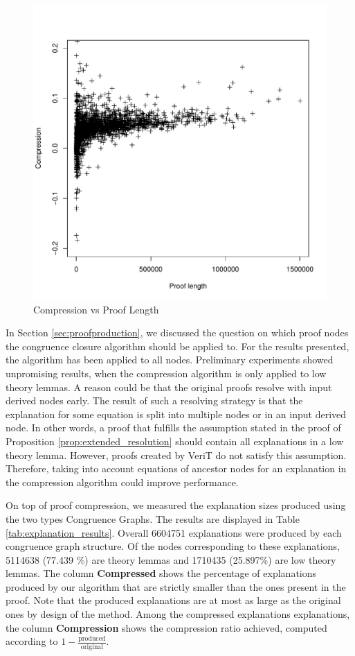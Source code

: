 \begin{figure}[h]
	\centering
	\includegraphics[scale=0.8]{chapters/congruence/figures/compression_vs_length.pdf}
	\caption{Compression vs Proof Length}
	\label{fig:congruence_compression}
\end{figure}

In Section \ref{sec:proofproduction}, we discussed the question on which proof nodes the congruence closure algorithm should be applied to.
For the results presented, the algorithm has been applied to all nodes.
Preliminary experiments showed unpromising results, when the compression algorithm is only applied to low theory lemmas.
A reason could be that the original proofs resolve with input derived nodes early.
The result of such a resolving strategy is that the explanation for some equation is split into multiple nodes or in an input derived node.
In other words, a proof that fulfills the assumption stated in the proof of Proposition \ref{prop:extended_resolution} should contain all explanations in a low theory lemma.
However, proofs created by VeriT do not satisfy this assumption.
Therefore, taking into account equations of ancestor nodes for an explanation in the compression algorithm could improve performance.

On top of proof compression, we measured the explanation sizes produced using the two types Congruence Graphs.
The results are displayed in Table \ref{tab:explanation_results}.
Overall 6604751 explanations were produced by each congruence graph structure.
Of the nodes corresponding to these explanations, 5114638 (77.439 \%) are theory lemmas and 1710435 (25.897\%) are low theory lemmas.
The column \textbf{Compressed} shows the percentage of explanations produced by our algorithm that are strictly smaller than the ones present in the proof.
Note that the produced explanations are at most as large as the original ones by design of the method.
Among the compressed explanations explanations, the column \textbf{Compression} shows the compression ratio achieved, computed according to $1 - \frac{\text{produced}}{\text{original}}$.

